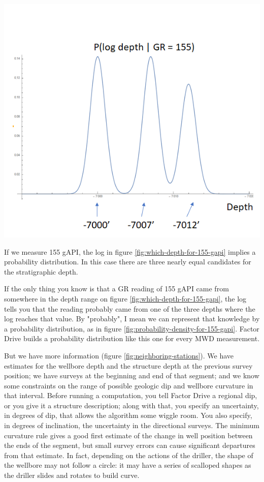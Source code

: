 \documentclass{tufte-handout}
\begin{document}
\begin{marginfigure}
  \includegraphics{probability-density-for-155-gapi.png}
  \caption{If we measure 155 gAPI, the log in figure \ref{fig:which-depth-for-155-gapi} implies
  a probability distribution. In this case there are three nearly equal candidates for the 
  stratigraphic depth.}
  \label{fig:probability-density-for-155-gapi}
\end{marginfigure}

If the only thing you know is that a GR reading of 155 gAPI came from somewhere in the depth range on figure
\ref{fig:which-depth-for-155-gapi}, the log tells you that the reading probably came from one of the three depths where the log reaches that value. By "probably", I mean we can represent that knowledge by a
probability distribution, as in figure \ref{fig:probability-density-for-155-gapi}. Factor Drive 
builds a probability distribution like this one for every MWD measurement.

But we have more information (figure \ref{fig:neighboring-stations}). We have estimates for the wellbore depth and the structure depth 
at the previous survey position; we have surveys at the beginning and end of that segment; and we know some constraints on the range of possible geologic dip and wellbore curvature in that interval. Before running a computation, you tell Factor Drive a regional dip, or you give it a structure description; along with that, you specify an uncertainty, in degrees of dip, that allows the algorithm some wiggle room. You also specify, in degrees of inclination, the uncertainty in the directional surveys. The minimum curvature rule gives a good first estimate of the change in well position between
the ends of the segment, but small survey errors can cause significant departures from that estimate.
In fact, depending on the actions of the driller, the shape of the wellbore may not follow a circle: it 
may have a series of scalloped shapes as the driller slides and rotates to build curve. 
\end{document}
